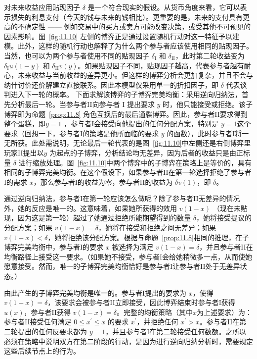 对未来收益应用贴现因子 \(\delta\) 是一个符合现实的假设。从货币角度来看，它可以表示损失的利息支付（今天的钱与未来的钱相比）。更重要的是，未来的支付具有更高的不确定性 —— 例如交易中的买方或卖方可能改变决策，或受其他不可预见的因素影响。图~\ref{fig:11.10} 左侧的博弈正是通过设置随机行动对这一特征予以建模。此外，这样的随机行动也解释了为什么两个参与者应该使用相同的贴现因子。当然，也可以为两个参与者使用不同的贴现因子 \({\delta }_{\mathrm{I}}\) 和 \({\delta }_{\mathrm{{II}}}\)，此时第二轮收益变为 \({\delta }_{\mathrm{I}}u\left( {1 - y}\right)\) 和 \({\delta }_{\mathrm{{II}}}v\left( y\right)\)。如果贴现因子不同，贴现因子越高，代表参与者越有耐心，未来收益与当前收益的差异更小。但这样的博弈分析会更加复杂，并且不会与纳什讨价还价解建立直接联系。因此本模型仅采用单一的折扣因子，即 \(\delta\) 代表谈判进入下一轮的概率。
下面求解该博弈的子博弈完美均衡：采用逆向归纳法，首先分析最后一轮。当参与者II向参与者 \(\mathrm{I}\) 提出要求 \(y\) 时，他只能接受或拒绝。该子博弈即为命题~\ref{prop:11.8} 角色互换后的最后通牒博弈。因此，参与者II要求得到整个蛋糕，即\(y = 1\) ，参与者I会接受向他提出的任何分配方案，特别是 \(y = 1\)这个要求（回想一下，参与者I的策略是他所面临的要求 \(y\) 的函数），此时参与者I将一无所获。此处需说明，无论最后一轮代表的是图~\ref{fig:11.10}中左侧还是右侧博弈里玩家II提出以\(y\) 为起点的子博弈，分析结论均无差异，因为后者的收益只是由正标量 \(\delta\) 进行缩放处理。图~\ref{fig:11.10}中两个博弈中的子博弈在策略上是等价的，具有相同的子博弈完美均衡。在这个假设下，如果参与者II在第一轮选择拒绝了参与者I的需求 \(x\)，那么参与者I的收益为零，参与者II的收益为 \({\delta v}\left( 1\right)\)，即 \(\delta\)。

通过逆向归纳法，参与者I在第一轮应该怎么做呢？除了参与者II无差异的情况外，她的反应是唯一的。这意味着，如果她所获得的效用 \(v\left( {1 - x}\right)\) （现在未贴现，因为这是第一轮）超过了她通过拒绝所能期望得到的数量 \(\delta\)，她将接受提议的分配方案；如果 \(v\left( {1 - x}\right)  = \delta\)，她将在接受和拒绝之间无差异；如果 \(v\left( {1 - x}\right)  < \delta\)，她将拒绝该分配方案。根据与命题~\ref{prop:11.8}相同的推理，在子博弈完美均衡中，参与者I的要求 \(x\) 被选择为满足 \(v\left( {1 - x}\right)  = \delta\)，并且参与者II在均衡路径上接受这一要求。（如果她不接受，参与者I会给她稍微多一点，从而使她愿意接受。然而，唯一的子博弈完美均衡恰好是参与者I让参与者II处于无差异状态。）

由此产生的子博弈完美均衡是唯一的。参与者I提出的要求为 \(x\)，使得 \(v\left( {1 - x}\right)  = \delta\)，该要求会被参与者II立即接受，因此博弈结束时参与者I获得 \(u\left( x\right)\)，参与者II获得 \(v\left( {1 - x}\right)  = \delta\)。完整的均衡策略（其中\(x\)为上述要求）为：参与者II接受任何满足 \(0 \leq  {x}^{\prime } \leq  x\) 的要求 \({x}^{\prime }\)，并拒绝任何 \({x}^{\prime } > x\)。参与者II在第二轮提出的任何反要求都为 \(y = 1\)，并且参与者I在第二轮接受任何数额。之所以必须在策略中说明双方在第二阶段的行动，是因为进行逆向归纳分析时，需要规定这些后续节点上的行为。

